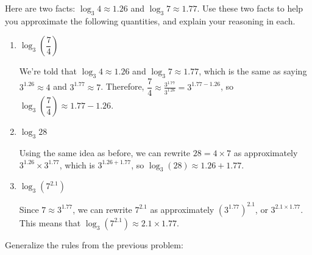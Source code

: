 \documentclass{article}
\begin{document}
\begin{enumerate}

  Here are two facts: $\log_3 4 \approx 1.26$ and $\log_3 7 \approx 1.77$. Use these two facts to help you approximate the following quantities, and explain your reasoning in each.

  \begin{enumerate}
  \item
    \begin{problem}[\vfill]
      $\log_3 \left( \dfrac{7}{4} \right)$
    \end{problem}

    \begin{solution}      
      We're told that $\log_3 4 \approx 1.26$ and
  $\log_3 7 \approx 1.77$, which is the same as saying $3^{1.26} \approx 4$ and $3^{1.77} \approx 7$. Therefore, $\dfrac{7}{4} \approx \frac{3^{1.77}}{3^{1.26}} = 3^{1.77 - 1.26}$, so $\log_3 \left( \dfrac{7}{4} \right) \approx 1.77 - 1.26$. 
    \end{solution}

  \item
    \begin{problem}[\vfill]
      $\log_3 28$
    \end{problem}

    \begin{solution}
      Using the same idea as before,
      we can rewrite $28=4\times 7$ as approximately
      $3^{1.26} \times 3^{1.77}$, 
      which is $3^{1.26+1.77}$, so $\log_3(28) \approx 1.26 + 1.77$.
    \end{solution}

  \item
    \begin{problem}[\vfill]
      $\log_3 \left( 7^{2.1} \right)$
    \end{problem}

    \begin{solution}
      Since $7 \approx 3^{1.77}$, we can rewrite $7^{2.1}$ as approximately
      $(3^{1.77})^{2.1}$, or $3^{2.1\times1.77}$. This means that
      $\log_3\left(7^{2.1}\right) \approx 2.1 \times 1.77$.
    \end{solution}

  \end{enumerate}

\end{enumerate}
Generalize the rules from the previous problem:
\end{document}
